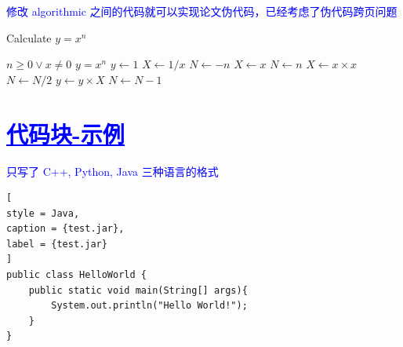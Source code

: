 \textcolor{blue}{修改 algorithmic 之间的代码就可以实现论文伪代码，已经考虑了伪代码跨页问题}
\begin{breakablealgorithm}
        \caption{Calculate $y = x^n$}
        \begin{algorithmic}[1] %
            \Require $n \geq 0 \vee x \neq 0$ 
            \Ensure  $y = x^n$
            \State $y \gets 1$
            \State $ X \gets 1 / x$
            \State $N \gets -n$
            \Else
            \State $X \gets x$
            \State $N \gets n$
            \EndIf
            \State $X \gets x \times x$
            \State $N \gets N / 2$
            \Else[$N$ is odd]
            \State $y \gets y \times X$
            \State $N \gets N - 1$
            \EndIf
            \EndWhile
     \end{algorithmic}
    \end{breakablealgorithm}

\section{\textcolor{blue}{\underline{\underline{代码块-示例}}}}
\textcolor{blue}{只写了 C++, Python, Java 三种语言的格式}



\begin{lstlisting}[
style = Java,
caption = {test.jar},
label = {test.jar}
]
public class HelloWorld {
    public static void main(String[] args){
        System.out.println("Hello World!");
    }
}
\end{lstlisting}


